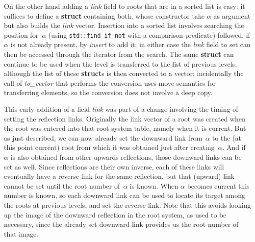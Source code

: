 \documentclass[12pt]{article}
\theoremstyle{plain}
\theoremstyle{definition}
\newcommand\std[1]{\texttt{std::#1}}
\begin{document}
On the other hand adding a \textit{link} field to roots that are in a sorted
list is easy: it suffices to define a \textbf{struct} containing both, whose
constructor take $\alpha$ as argument but also builds the \textit{link} vector.
Insertion into a sorted list involves searching the position for~$\alpha$ (using
\std{find\_\!if\_\!not} with a comparison predicate) followed, if $\alpha$ is
not already present, by \textit{insert} to add it; in either case the
\textit{link} field to set can then be accessed through the iterator from the
search. The same \textbf{struct} can continue to be used when the level is
transferred to the list of previous levels, although the list of these
\textbf{struct}s is then converted to a vector; incidentally the call of
\textit{to\_\!vector} that performs the conversion uses move semantics for
transferring elements, so the conversion does not involve a deep copy.

This early addition of a field \textit{link} was part of a change involving the
timing of setting the reflection links. Originally the link vector of a root was
created when the root was entered into that root system table, namely when it is
current. But as just described, we can now already set the downward link
from~$\alpha$ to the (at this point current) root from which it was obtained
just after creating~$\alpha$. And if $\alpha$ is also obtained from other
upwards reflections, those downward links can be set as well. Since reflections
are their own inverse, each of these links will eventually have a reverse link
for the same reflection, but that (upward) link cannot be set until the root
number of~$\alpha$ is known. When $\alpha$ becomes current this number is known,
so each downward link can be used to locate its target among the roots at
previous levels, and set the reverse link. Note that this avoids looking up the
image of the downward reflection in the root system, as used to be necessary,
since the already set downward link provides us the root number of that image.
\end{document}
